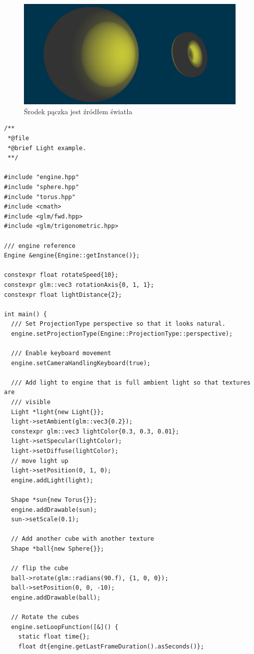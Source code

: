 \documentclass[11pt]{article}
\begin{document}
\begin{figure}[htbp]
\centering
\includegraphics[width=.9\linewidth]{img/test16.png}
\caption{Środek pączka jest źródłem światła}
\end{figure}


\begin{verbatim}
/**
 *@file
 *@brief Light example.
 **/

#include "engine.hpp"
#include "sphere.hpp"
#include "torus.hpp"
#include <cmath>
#include <glm/fwd.hpp>
#include <glm/trigonometric.hpp>

/// engine reference
Engine &engine{Engine::getInstance()};

constexpr float rotateSpeed{10};
constexpr glm::vec3 rotationAxis{0, 1, 1};
constexpr float lightDistance{2};

int main() {
  /// Set ProjectionType perspective so that it looks natural.
  engine.setProjectionType(Engine::ProjectionType::perspective);

  /// Enable keyboard movement
  engine.setCameraHandlingKeyboard(true);

  /// Add light to engine that is full ambient light so that textures are
  /// visible
  Light *light{new Light{}};
  light->setAmbient(glm::vec3{0.2});
  constexpr glm::vec3 lightColor{0.3, 0.3, 0.01};
  light->setSpecular(lightColor);
  light->setDiffuse(lightColor);
  // move light up
  light->setPosition(0, 1, 0);
  engine.addLight(light);

  Shape *sun{new Torus{}};
  engine.addDrawable(sun);
  sun->setScale(0.1);

  // Add another cube with another texture
  Shape *ball{new Sphere{}};

  // flip the cube
  ball->rotate(glm::radians(90.f), {1, 0, 0});
  ball->setPosition(0, 0, -10);
  engine.addDrawable(ball);

  // Rotate the cubes
  engine.setLoopFunction([&]() {
    static float time{};
    float dt{engine.getLastFrameDuration().asSeconds()};


\end{verbatim}
\end{document}
